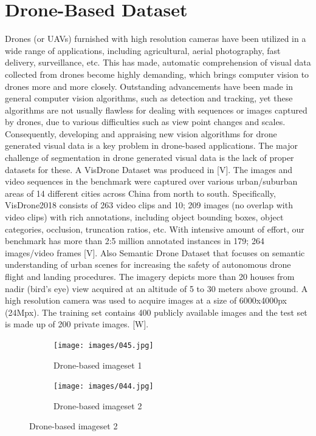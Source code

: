 \section{Drone-Based Dataset }
Drones (or UAVs) furnished with high resolution cameras have been utilized in a wide range of applications, including agricultural, aerial photography, fast delivery, surveillance, etc. This has made, automatic comprehension of visual data collected from drones become highly demanding, which brings computer vision to drones more and more closely. Outstanding advancements have been made in general computer vision algorithms, such as detection and tracking, yet these algorithms are not usually flawless for dealing with sequences or images captured by drones, due to various difficulties such as view point changes and scales. Consequently, developing and appraising new vision algorithms for drone generated visual data is a key problem in drone-based applications.
The major challenge of segmentation in drone generated visual data is the lack of proper datasets for these. A VisDrone Dataset was produced in [V]. The images and video sequences in the benchmark were captured over various urban/suburban areas of 14 different cities across China from north to south. Specifically, VisDrone2018 consists of 263 video clips and 10; 209 images (no overlap with video clips) with rich annotations, including object bounding boxes, object categories, occlusion, truncation ratios, etc. With intensive amount of effort, our benchmark has more than 2:5 million annotated instances in 179; 264 images/video frames [V]. Also Semantic Drone Dataset that focuses on semantic understanding of urban scenes for increasing the safety of autonomous drone flight and landing procedures. The imagery depicts more than 20 houses from nadir (bird's eye) view acquired at an altitude of 5 to 30 meters above ground. A high resolution camera was used to acquire images at a size of 6000x4000px (24Mpx). The training set contains 400 publicly available images and the test set is made up of 200 private images. [W].

\begin{figure}[H]
  
  \begin{subfigure}[b]{0.4\textwidth}
    \texttt{[image: images/045.jpg]}
    \caption{Drone-based imageset 1}
    \label{fig:1}
  \end{subfigure}
  
  \begin{subfigure}[b]{0.4\textwidth}
    \texttt{[image: images/044.jpg]}
    \caption{Drone-based imageset 2}
    \label{fig:2}
  \end{subfigure}
\end{figure}